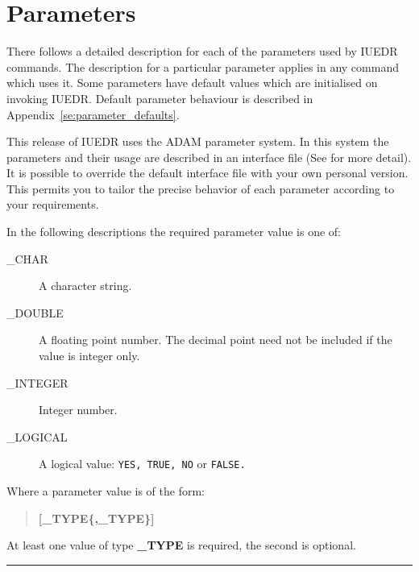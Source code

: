 \newpage

\section{\label{se:parameters}Parameters}

There follows a detailed description for each of the parameters used by
IUEDR commands.
The description for a particular parameter applies in any
command which uses it.
Some parameters have default values which are initialised on invoking IUEDR\@.
Default parameter behaviour is described in
Appendix~\ref{se:parameter_defaults}\@.

This release of IUEDR uses the ADAM parameter system. In this system
the parameters and their usage are described in an interface file
(See  for more detail). It is possible to override the
default
interface file with your own personal version. This permits you to tailor
the precise behavior of each parameter according to your requirements.

In the following descriptions the required parameter value is one of:
\begin{description}
   \item [\_CHAR] A character string.
   \item [\_DOUBLE] A floating point number.  The decimal point need not be
                    included if the value is integer only.
   \item [\_INTEGER] Integer number.
   \item [\_LOGICAL] A logical value: {\tt YES, TRUE, NO} or {\tt FALSE.}
\end{description}

Where a parameter value is of the form:

\begin{quote}
{\bf
   [\_TYPE\{,\_TYPE\}]
}
\end{quote}

At least one value of type {\bf \_TYPE} is required, the second is optional.

\rule{\textwidth}{0.5mm}

